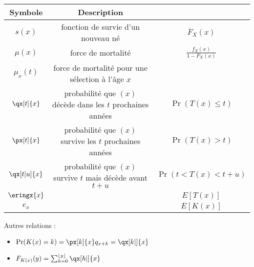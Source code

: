 \begin{center}
	\begin{tabular}{ccc}
		\hline
		   Symbole    &                         Description                         &                                               \\ \hline
		   $s(x)$     &             fonction de survie d'un nouveau né              &             $\overline{F}_{X}(x)$             \\
		  $\mu(x)$    &                     force de mortalité                      & $\displaystyle \frac{f_{X}(x)}{1 - F_{X}(x)}$ \\
		 $\mu_x(t)$   &      force de mortalité pour une sélection à l'âge $x$      &                                               \\
		 $\qx[t]{x}$  & probabilité que $(x)$ décède dans les $t$ prochaines années &              $\Pr(T(x) \leq t)$               \\
		 $\px[t]{x}$  &   probabilité que $(x)$ survive les $t$ prochaines années   &                $\Pr(T(x) > t)$                \\
		$\qx[t|u]{x}$ & probabilité que $(x)$ survive $t$ mais décède avant $t + u$ &              $\Pr(t<T(x)<t + u)$              \\
		$\eringx{x}$  &                                                             &                   $E[T(x)]$                   \\
		    $e_x$     &                                                             &                   $E[K(x)]$                   \\ \hline
	\end{tabular}
\end{center}

Autres relations : 

\begin{itemize}
	\item $\Pr(K(x) = k) = \px[k]{x}q_{x+k} = \qx[k|]{x}$
	\item $F_{K(x)}(y) = \sum_{h = 0}^{\lfloor y \rfloor}\qx[h|]{x}$
\end{itemize}


